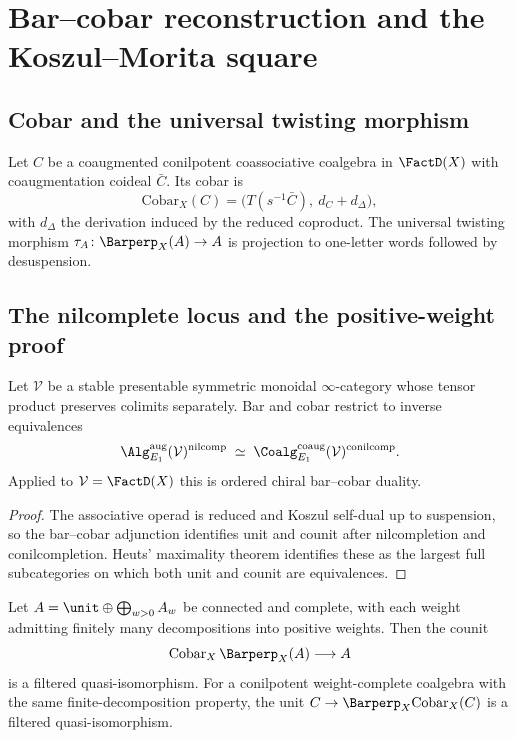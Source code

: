 \chapter{Bar--cobar reconstruction and the Koszul--Morita square}
\label{ch:bar-cobar}

\section{Cobar and the universal twisting morphism}

Let $C$ be a coaugmented conilpotent coassociative coalgebra in
$\FactD(X)$ with coaugmentation coideal $\bar C$. Its cobar is
\[
  \mathrm{Cobar}_X(C) = \bigl(T(s^{-1}\bar C),\ d_C + d_\Delta\bigr),
\]
with $d_\Delta$ the derivation induced by the reduced coproduct. The
universal twisting morphism $\tau_A\colon \Barperp_X(A)\to A$ is
projection to one-letter words followed by desuspension.

\section{The nilcomplete locus and the positive-weight proof}

\begin{theorem}
\label{thm:koszul-internal}
\StatusProved{} Let $\mathcal V$ be a stable presentable symmetric
monoidal $\infty$-category whose tensor product preserves colimits
separately. Bar and cobar restrict to inverse equivalences
\[
  \Alg^{\mathrm{aug}}_{E_1}(\mathcal V)^{\mathrm{nilcomp}}
  \;\simeq\;
  \Coalg^{\mathrm{coaug}}_{E_1}(\mathcal V)^{\mathrm{conilcomp}} .
\]
Applied to $\mathcal V=\FactD(X)$ this is ordered chiral bar--cobar
duality.
\end{theorem}

\begin{proof}
The associative operad is reduced and Koszul self-dual up to suspension,
so the bar--cobar adjunction identifies unit and counit after
nilcompletion and conilcompletion. Heuts' maximality theorem
\cite{Heu24} identifies these as the largest full subcategories on which
both unit and counit are equivalences.
\end{proof}

\begin{theorem}
\label{thm:positive-reconstruction}
\StatusProved{} Let $A=\unit\oplus\bigoplus_{w>0}A_w$ be connected and
complete, with each weight admitting finitely many decompositions into
positive weights. Then the counit
\[
  \mathrm{Cobar}_X\,\Barperp_X(A)\longrightarrow A
\]
is a filtered quasi-isomorphism. For a conilpotent weight-complete
coalgebra with the same finite-decomposition property, the unit
$C\to\Barperp_X\mathrm{Cobar}_X(C)$ is a filtered quasi-isomorphism.
\end{theorem}


